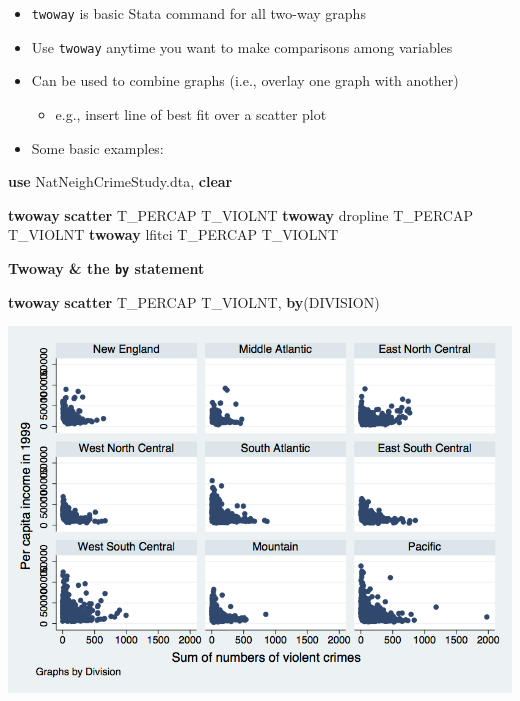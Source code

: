 \documentclass[
]{book}
\newenvironment{Shaded}{\begin{snugshade}}{\end{snugshade}}
\newcommand{\BaseNTok}[1]{\textcolor[rgb]{0.00,0.00,0.81}{#1}}
\newcommand{\KeywordTok}[1]{\textcolor[rgb]{0.13,0.29,0.53}{\textbf{#1}}}
\newcommand{\NormalTok}[1]{#1}
\providecommand{\tightlist}{%
  \setlength{\itemsep}{0pt}\setlength{\parskip}{0pt}}
\begin{document}
\begin{itemize}
\tightlist
\item
  \texttt{twoway} is basic Stata command for all two-way graphs
\item
  Use \texttt{twoway} anytime you want to make comparisons among variables
\item
  Can be used to combine graphs (i.e., overlay one graph with another)

  \begin{itemize}
  \tightlist
  \item
    e.g., insert line of best fit over a scatter plot
  \end{itemize}
\item
  Some basic examples:
\end{itemize}

\begin{Shaded}
\begin{Highlighting}[]
\KeywordTok{use}\NormalTok{ NatNeighCrimeStudy.dta, }\KeywordTok{clear}

\KeywordTok{twoway} \KeywordTok{scatter}\NormalTok{ T\_PERCAP T\_VIOLNT}
\KeywordTok{twoway} \BaseNTok{dropline}\NormalTok{ T\_PERCAP T\_VIOLNT}
\KeywordTok{twoway}\NormalTok{ lfitci T\_PERCAP T\_VIOLNT}
\end{Highlighting}
\end{Shaded}

\textbf{Twoway \& the \texttt{by} statement}

\begin{Shaded}
\begin{Highlighting}[]
\KeywordTok{twoway} \KeywordTok{scatter}\NormalTok{ T\_PERCAP T\_VIOLNT, }\KeywordTok{by}\NormalTok{(DIVISION)}
\end{Highlighting}
\end{Shaded}

\includegraphics{Stata/StataGraphics/images/twowayby.png}
\end{document}
